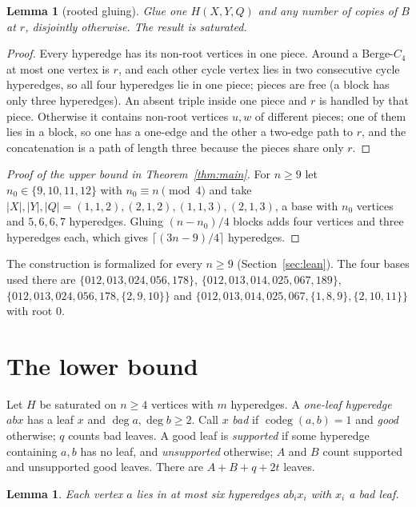 \documentclass[11pt]{article}
\newtheorem{lemma}[theorem]{Lemma}
\theoremstyle{remark}
\newcommand{\codeg}{\operatorname{codeg}}
\begin{document}
\begin{lemma}[rooted gluing]\label{lem:glue}
Glue one $H(X,Y,Q)$ and any number of copies of $B$ at $r$, disjointly
otherwise. The result is saturated.
\end{lemma}

\begin{proof}
Every hyperedge has its non-root vertices in one piece. Around a
Berge-$C_4$ at most one vertex is $r$, and each other cycle vertex lies
in two consecutive cycle hyperedges, so all four hyperedges lie in one
piece; pieces are free (a block has only three hyperedges). An absent
triple inside one piece and $r$ is handled by that piece. Otherwise it
contains non-root vertices $u,w$ of different pieces; one of them lies in
a block, so one has a one-edge and the other a two-edge path to $r$, and
the concatenation is a path of length three because the pieces share only
$r$.
\end{proof}

\begin{proof}[Proof of the upper bound in Theorem~\ref{thm:main}]
For $n\ge9$ let $n_0\in\{9,10,11,12\}$ with $n_0\equiv n\pmod4$ and take
$|X|,|Y|,|Q|=(1,1,2),(2,1,2),(1,1,3),(2,1,3)$, a base with $n_0$ vertices
and $5,6,6,7$ hyperedges. Gluing $(n-n_0)/4$ blocks adds four vertices and
three hyperedges each, which gives $\lceil(3n-9)/4\rceil$ hyperedges.
\end{proof}

The construction is formalized for every $n\ge9$
(Section~\ref{sec:lean}). The four bases used there are
$\{012,013,024,056,178\}$,
$\{012,013,014,025,067,189\}$,
$\{012,013,024,056,178,\{2,9,10\}\}$ and
$\{012,013,014,025,067,\{1,8,9\},\{2,10,11\}\}$ with root $0$.

\section{The lower bound}\label{sec:lower}

Let $H$ be saturated on $n\ge4$ vertices with $m$ hyperedges. A
\emph{one-leaf hyperedge} $abx$ has a leaf $x$ and $\deg a,\deg b\ge2$.
Call $x$ \emph{bad} if $\codeg(a,b)=1$ and \emph{good} otherwise; $q$
counts bad leaves. A good leaf is \emph{supported} if some hyperedge
containing $a,b$ has no leaf, and \emph{unsupported} otherwise; $A$ and
$B$ count supported and unsupported good leaves. There are $A+B+q+2t$
leaves.

\begin{lemma}\label{lem:local}
Each vertex $a$ lies in at most six hyperedges $ab_ix_i$ with $x_i$ a bad
leaf.
\end{lemma}
\end{document}
